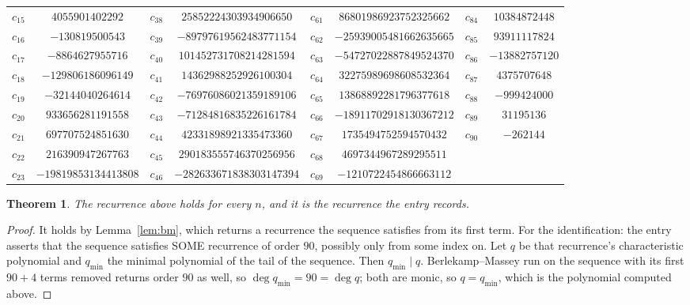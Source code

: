 \documentclass[11pt,a4paper]{article}
\theoremstyle{plain}
\newtheorem{theorem}{Theorem}
\theoremstyle{definition}
\begin{document}
\begin{center}
\begin{tabular}{cccccccc}
$c_{15}$ & $4055901402292$ & $c_{38}$ & $25852224303934906650$ & $c_{61}$ & $86801986923752325662$ & $c_{84}$ & $10384872448$ \\
$c_{16}$ & $-130819500543$ & $c_{39}$ & $-89797619562483771154$ & $c_{62}$ & $-25939005481662635665$ & $c_{85}$ & $93911117824$ \\
$c_{17}$ & $-8864627955716$ & $c_{40}$ & $101452731708214281594$ & $c_{63}$ & $-54727022887849524370$ & $c_{86}$ & $-13882757120$ \\
$c_{18}$ & $-129806186096149$ & $c_{41}$ & $14362988252926100304$ & $c_{64}$ & $32275989698608532364$ & $c_{87}$ & $4375707648$ \\
$c_{19}$ & $-32144040264614$ & $c_{42}$ & $-76976086021359189106$ & $c_{65}$ & $13868892281796377618$ & $c_{88}$ & $-999424000$ \\
$c_{20}$ & $933656281191558$ & $c_{43}$ & $-71284816835226161784$ & $c_{66}$ & $-18911702918130367212$ & $c_{89}$ & $31195136$ \\
$c_{21}$ & $697707524851630$ & $c_{44}$ & $42331898921335473360$ & $c_{67}$ & $1735494752594570432$ & $c_{90}$ & $-262144$ \\
$c_{22}$ & $216390947267763$ & $c_{45}$ & $290183555746370256956$ & $c_{68}$ & $4697344967289295511$ &  &  \\
$c_{23}$ & $-19819853134413808$ & $c_{46}$ & $-282633671838303147394$ & $c_{69}$ & $-1210722454866663112$ &  &  \\
\end{tabular}
\end{center}

\begin{theorem}
The recurrence above holds for every $n$, and it is the recurrence the entry records.
\end{theorem}

\begin{proof}
It holds by Lemma~\ref{lem:bm}, which returns a recurrence the sequence satisfies from its
first term. For the identification: the entry asserts that the sequence satisfies SOME
recurrence of order $90$, possibly only from some index on. Let $q$ be that recurrence's
characteristic polynomial and $q_{\min}$ the minimal polynomial of the tail of the sequence.
Then $q_{\min}\mid q$. Berlekamp--Massey run on the sequence with its first $90+4$ terms
removed returns order $90$ as well, so $\deg q_{\min}=90=\deg q$; both are monic, so
$q=q_{\min}$, which is the polynomial computed above.
\end{proof}
\end{document}
